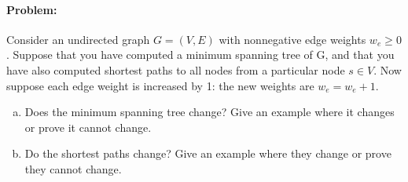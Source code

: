 \documentclass[12pt]{article}
\begin{document}
\paragraph{Problem:}

Consider an undirected graph $G = (V, E)$ with nonnegative edge weights
$ w_e \ge 0$. Suppose that you have computed a minimum spanning tree of
G, and that you have also computed shortest paths to all nodes from a
particular node $s \in V$.  Now suppose each edge weight is increased by
1: the new weights are $w_e = w_e + 1$.

\begin{enumerate}[(a)]
\item Does the minimum spanning tree change? Give an example where it
      changes or prove it cannot change.
\item Do the shortest paths change? Give an example where they change or
      prove they cannot change.
\end{enumerate}
\end{document}
